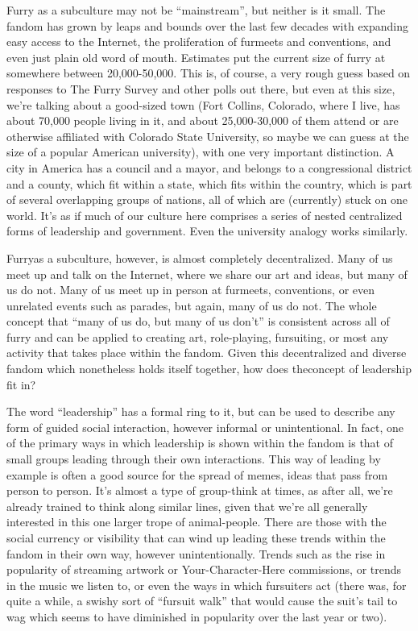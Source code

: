 
Furry as a subculture may not be ``mainstream'', but neither is it small. The fandom has grown by leaps and bounds over the last few decades with expanding easy access to the Internet, the proliferation of furmeets and conventions, and even just plain old word of mouth. Estimates put the current size of furry at somewhere between 20,000-50,000. This is, of course, a very rough guess based on responses to The Furry Survey and other polls out there, but even at this size, we're talking about a good-sized town (Fort Collins, Colorado, where I live, has about 70,000 people living in it, and about 25,000-30,000 of them attend or are otherwise affiliated with Colorado State University, so maybe we can guess at the size of a popular American university), with one very important distinction. A city in America has a council and a mayor, and belongs to a congressional district and a county, which fit within a state, which fits within the country, which is part of several overlapping groups of nations, all of which are (currently) stuck on one world. It's as if much of our culture here comprises a series of nested centralized forms of leadership and government. Even the university analogy works similarly.

Furryas a subculture, however, is almost completely decentralized. Many of us meet up and talk on the Internet, where we share our art and ideas, but many of us do not. Many of us meet up in person at furmeets, conventions, or even unrelated events such as parades, but again, many of us do not. The whole concept that ``many of us do, but many of us don't'' is consistent across all of furry and can be applied to creating art, role-playing, fursuiting, or most any activity that takes place within the fandom. Given this decentralized and diverse fandom which nonetheless holds itself together, how does theconcept of leadership fit in?

The word ``leadership'' has a formal ring to it, but can be used to describe any form of guided social interaction, however informal or unintentional. In fact, one of the primary ways in which leadership is shown within the fandom is that of small groups leading through their own interactions. This way of leading by example is often a good source for the spread of memes, ideas that pass from person to person. It's almost a type of group-think at times, as after all, we're already trained to think along similar lines, given that we're all generally interested in this one larger trope of animal-people. There are those with the social currency or visibility that can wind up leading these trends within the fandom in their own way, however unintentionally. Trends such as the rise in popularity of streaming artwork or Your-Character-Here commissions, or trends in the music we listen to, or even the ways in which fursuiters act (there was, for quite a while, a swishy sort of ``fursuit walk'' that would cause the suit's tail to wag which seems to have diminished in popularity over the last year or two).

